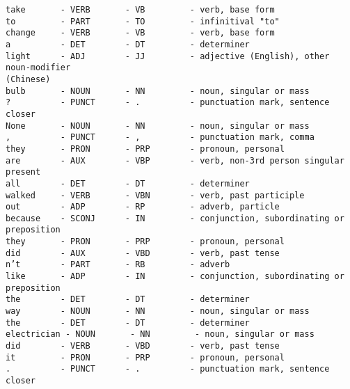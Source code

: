 \documentclass[11pt]{article}
\begin{document}
\begin{Verbatim}[commandchars=\\\{\}]
take       - VERB       - VB         - verb, base form
to         - PART       - TO         - infinitival "to"
change     - VERB       - VB         - verb, base form
a          - DET        - DT         - determiner
light      - ADJ        - JJ         - adjective (English), other noun-modifier
(Chinese)
bulb       - NOUN       - NN         - noun, singular or mass
?          - PUNCT      - .          - punctuation mark, sentence closer
None       - NOUN       - NN         - noun, singular or mass
,          - PUNCT      - ,          - punctuation mark, comma
they       - PRON       - PRP        - pronoun, personal
are        - AUX        - VBP        - verb, non-3rd person singular present
all        - DET        - DT         - determiner
walked     - VERB       - VBN        - verb, past participle
out        - ADP        - RP         - adverb, particle
because    - SCONJ      - IN         - conjunction, subordinating or preposition
they       - PRON       - PRP        - pronoun, personal
did        - AUX        - VBD        - verb, past tense
n’t        - PART       - RB         - adverb
like       - ADP        - IN         - conjunction, subordinating or preposition
the        - DET        - DT         - determiner
way        - NOUN       - NN         - noun, singular or mass
the        - DET        - DT         - determiner
electrician - NOUN       - NN         - noun, singular or mass
did        - VERB       - VBD        - verb, past tense
it         - PRON       - PRP        - pronoun, personal
.          - PUNCT      - .          - punctuation mark, sentence closer
    \end{Verbatim}
\end{document}
